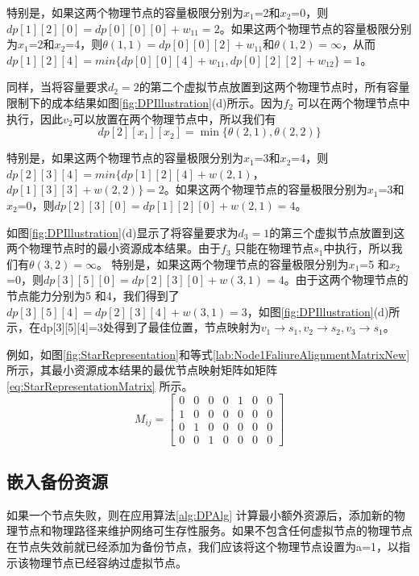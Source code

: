 特别是，如果这两个物理节点的容量极限分别为$x_1$=2和$x_2$=0，则$dp[1][2][0]= dp[0][0][0]+w_{11}=2$。如果这两个物理节点的容量极限分别为$x_1$=2和$x_2$=4，则$\theta (1,1)=dp[0][0][2]+w_{11}$和$\theta (1,2)=\infty$，从而$dp[1][2][4]=min\{ dp[0][0][4]+w_{11}, dp[0][2][2]+w_{12} \}=1$。

同样，当将容量要求$d_2=2$的第二个虚拟节点放置到这两个物理节点时，所有容量限制下的成本结果如图\ref{fig:DPIllustration}(d)所示。因为$f_2$ 可以在两个物理节点中执行，因此$v_2$可以放置在两个物理节点中，所以我们有
\begin{equation}
dp[2][{x_1}][{x_2}] = \min \{\theta (2,1),\theta (2,2)\}
\end{equation}


特别是，如果这两个物理节点的容量极限分别为$x_1$=3和$x_2$=4，则$dp[2][3][4]=min\{dp[1][2][4]+w(2,1)$，$dp[1][3][3]+w(2,2)\}=2$。如果这两个物理节点的容量极限分别为$x_1$=3和$x_2$=0，则$dp[2][3][0]=dp[1][2][0]+w(2,1)=4$。

如图\ref{fig:DPIllustration}(d)显示了将容量要求为$d_3=1$的第三个虚拟节点放置到这两个物理节点时的最小资源成本结果。由于$f_3$ 只能在物理节点$s_1$中执行，所以我们有$\theta (3,2)=\infty$。 特别是，如果这两个物理节点的容量极限分别为$x_1$=5 和$x_2$=0，则$dp[3][5][0]=dp[2][3][0]+w(3,1)=4$。由于这两个物理节点的节点能力分别为5 和4，我们得到了$dp[3][5][4]=dp[2][3][4]+w(3,1)=3$，如图\ref{fig:DPIllustration}(d)所示，在dp[3][5][4]=3处得到了最佳位置，节点映射为$v_1\rightarrow s_1, v_2\rightarrow s_2, v_3\rightarrow s_1$。

例如，如图\ref{fig:StarRepresentation}和等式\ref{lab:Node1FaliureAlignmentMatrixNew} 所示，其最小资源成本结果的最优节点映射矩阵如矩阵\ref{eq:StarRepresentationMatrix} 所示。
\begin{equation}
M_{ij}=\left[ {\begin{array}{*{20}{c}}
0&0&0&0&1&0&0\\
1&0&0&0&0&0&0\\
0&1&0&0&0&0&0\\
0&0&1&0&0&0&0
\end{array}} \right]
\label{eq:StarRepresentationMatrix}
\end{equation}
\subsection{嵌入备份资源}
如果一个节点失败，则在应用算法\ref{alg:DPAlg} 计算最小额外资源后，添加新的物理节点和物理路径来维护网络可生存性服务。如果不包含任何虚拟节点的物理节点在节点失效前就已经添加为备份节点，我们应该将这个物理节点设置为a=1，以指示该物理节点已经容纳过虚拟节点。

